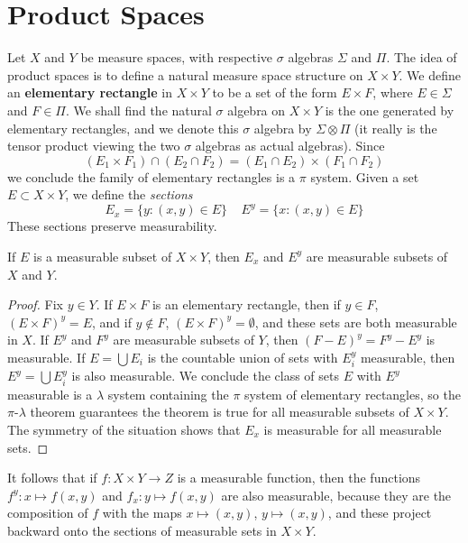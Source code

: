 \chapter{Product Spaces}

Let $X$ and $Y$ be measure spaces, with respective $\sigma$ algebras $\Sigma$ and $\Pi$. The idea of product spaces is to define a natural measure space structure on $X \times Y$. We define an {\bf elementary rectangle} in $X \times Y$ to be a set of the form $E \times F$, where $E \in \Sigma$ and $F \in \Pi$. We shall find the natural $\sigma$ algebra on $X \times Y$ is the one generated by elementary rectangles, and we denote this $\sigma$ algebra by $\Sigma \otimes \Pi$ (it really is the tensor product viewing the two $\sigma$ algebras as actual algebras). Since
%
\[ (E_1 \times F_1) \cap (E_2 \cap F_2) = (E_1 \cap E_2) \times (F_1 \cap F_2) \]
%
we conclude the family of elementary rectangles is a $\pi$ system. Given a set $E \subset X \times Y$, we define the {\it sections}
%
\[ E_x = \{ y: (x,y) \in E \}\ \ \ \ \ E^y = \{ x: (x,y) \in E \} \]
%
These sections preserve measurability.

\begin{lemma}
    If $E$ is a measurable subset of $X \times Y$, then $E_x$ and $E^y$ are measurable subsets of $X$ and $Y$.
\end{lemma}
\begin{proof}
    Fix $y \in Y$. If $E \times F$ is an elementary rectangle, then if $y \in F$, $(E \times F)^y = E$, and if $y \not \in F$, $(E \times F)^y = \emptyset$, and these sets are both measurable in $X$. If $E^y$ and $F^y$ are measurable subsets of $Y$, then $(F - E)^y = F^y - E^y$ is measurable. If $E = \bigcup E_i$ is the countable union of sets with $E_i^y$ measurable, then $E^y = \bigcup E_i^y$ is also measurable. We conclude the class of sets $E$ with $E^y$ measurable is a $\lambda$ system containing the $\pi$ system of elementary rectangles, so the $\pi$-$\lambda$ theorem guarantees the theorem is true for all measurable subsets of $X \times Y$. The symmetry of the situation shows that $E_x$ is measurable for all measurable sets.
\end{proof}

It follows that if $f: X \times Y \to Z$ is a measurable function, then the functions $f^y: x \mapsto f(x,y)$ and $f_x: y \mapsto f(x,y)$ are also measurable, because they are the composition of $f$ with the maps $x \mapsto (x,y)$, $y \mapsto (x,y)$, and these project backward onto the sections of measurable sets in $X \times Y$.


